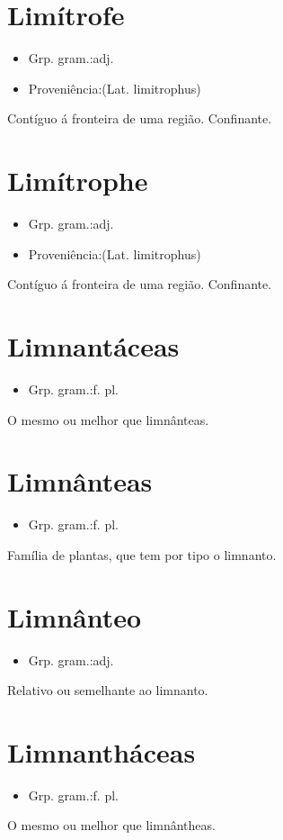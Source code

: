 \section{Limítrofe}
\begin{itemize}
\item {Grp. gram.:adj.}
\end{itemize}
\begin{itemize}
\item {Proveniência:(Lat. \textunderscore limitrophus\textunderscore )}
\end{itemize}
Contíguo á fronteira de uma região.
Confinante.
\section{Limítrophe}
\begin{itemize}
\item {Grp. gram.:adj.}
\end{itemize}
\begin{itemize}
\item {Proveniência:(Lat. \textunderscore limitrophus\textunderscore )}
\end{itemize}
Contíguo á fronteira de uma região.
Confinante.
\section{Limnantáceas}
\begin{itemize}
\item {Grp. gram.:f. pl.}
\end{itemize}
O mesmo ou melhor que \textunderscore limnânteas\textunderscore .
\section{Limnânteas}
\begin{itemize}
\item {Grp. gram.:f. pl.}
\end{itemize}
Família de plantas, que tem por tipo o limnanto.
\section{Limnânteo}
\begin{itemize}
\item {Grp. gram.:adj.}
\end{itemize}
Relativo ou semelhante ao limnanto.
\section{Limnantháceas}
\begin{itemize}
\item {Grp. gram.:f. pl.}
\end{itemize}
O mesmo ou melhor que \textunderscore limnântheas\textunderscore .
